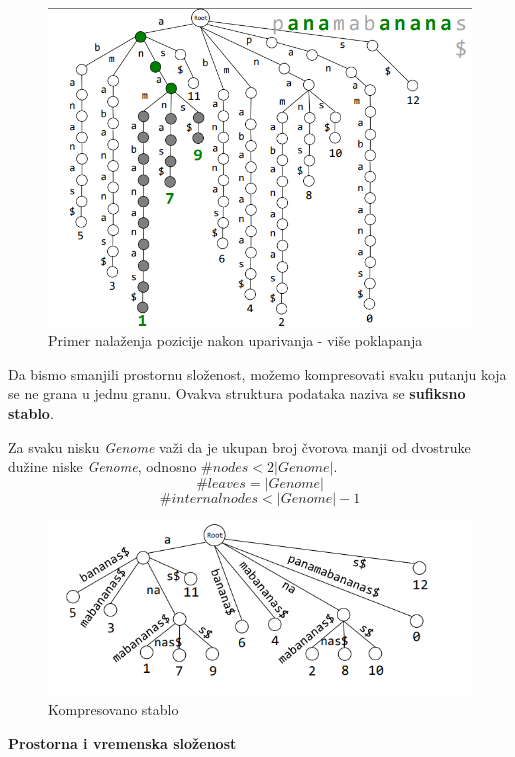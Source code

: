 \begin{figure}[h!]
\centering
\includegraphics[scale=0.5]{poglavlja/9/slike/sufiksnoStabloNaciIndeksPocetkaVise.png}
\caption{Primer nalaženja pozicije nakon uparivanja - više poklapanja}
\end{figure}

\clearpage
Da bismo smanjili prostornu složenost, možemo kompresovati svaku putanju koja se ne grana u jednu granu. Ovakva struktura podataka naziva se \textbf{sufiksno stablo}.


Za svaku nisku \textit{Genome} važi da je ukupan broj čvorova manji od dvostruke dužine niske \textit{Genome}, odnosno $\# nodes < 2|Genome|.$
$$\# leaves = |Genome|$$
$$\# internal nodes < |Genome| - 1$$


\begin{figure}[h!]
\centering
\includegraphics[scale=0.5]{poglavlja/9/slike/sufiksnoStabloKompresovano.png}
\caption{Kompresovano stablo}
\label{slika:X}
\end{figure}

\textbf{Prostorna i vremenska složenost}


